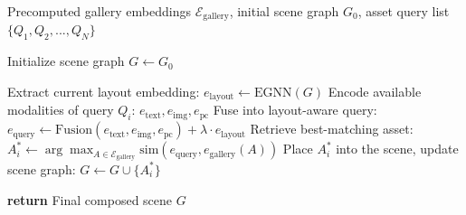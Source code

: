 \begin{algorithm}[t]
\caption{Iterative Layout-Aware Scene Composition}
\label{alg:iterative}
\begin{algorithmic}[1]
\REQUIRE Precomputed gallery embeddings $\mathcal{E}_{\text{gallery}}$, initial scene graph $G_0$, asset query list $\{Q_1, Q_2, ..., Q_N\}$

\STATE Initialize scene graph $G \leftarrow G_0$

    \STATE Extract current layout embedding: $e_{\text{layout}} \leftarrow \text{EGNN}(G)$
    \STATE Encode available modalities of query $Q_i$: $e_{\text{text}}, e_{\text{img}}, e_{\text{pc}}$
    \STATE Fuse into layout-aware query: $e_{\text{query}} \leftarrow \text{Fusion}(e_{\text{text}}, e_{\text{img}}, e_{\text{pc}}) + \lambda \cdot e_{\text{layout}}$
    \STATE Retrieve best-matching asset: $A^*_i \leftarrow \arg\max_{A \in \mathcal{E}_{\text{gallery}}} \text{sim}(e_{\text{query}}, e_{\text{gallery}}(A))$
    \STATE Place $A^*_i$ into the scene, update scene graph: $G \leftarrow G \cup \{A^*_i\}$
\ENDFOR

\STATE \textbf{return} Final composed scene $G$
\end{algorithmic}
\end{algorithm}